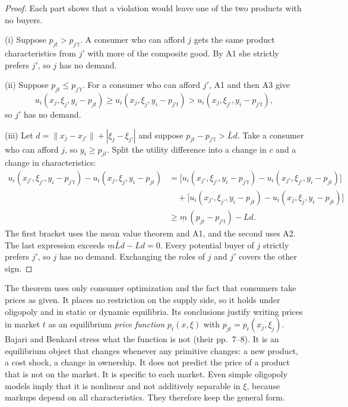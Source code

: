 \begin{proof}
Each part shows that a violation would leave one of the two products with no buyers.

(i) Suppose $p_{jt} > p_{j't}$. A consumer who can afford $j$ gets the same product characteristics from $j'$ with more of the
composite good. By A1 she strictly prefers $j'$, so $j$ has no demand.

(ii) Suppose $p_{jt} \le p_{j't}$. For a consumer who can afford $j'$, A1 and then A3 give
\begin{equation*}
  u_i(x_j, \xi_j, y_i - p_{jt}) \ge u_i(x_j, \xi_j, y_i - p_{j't}) > u_i(x_j, \xi_{j'}, y_i - p_{j't}) ,
\end{equation*}
so $j'$ has no demand.

(iii) Let $d = \lVert x_j - x_{j'} \rVert + |\xi_j - \xi_{j'}|$ and suppose $p_{jt} - p_{j't} > \bar L d$. Take a consumer who can
afford $j$, so $y_i \ge p_{jt}$. Split the utility difference into a change in $c$ and a change in characteristics:
\begin{align*}
  u_i(x_{j'}, \xi_{j'}, y_i - p_{j't}) - u_i(x_j, \xi_j, y_i - p_{jt})
  &= \bigl[u_i(x_{j'}, \xi_{j'}, y_i - p_{j't}) - u_i(x_{j'}, \xi_{j'}, y_i - p_{jt})\bigr] \\
  &\quad + \bigl[u_i(x_{j'}, \xi_{j'}, y_i - p_{jt}) - u_i(x_j, \xi_j, y_i - p_{jt})\bigr] \\
  &\ge \underline{m}\,(p_{jt} - p_{j't}) - L d .
\end{align*}
The first bracket uses the mean value theorem and A1, and the second uses A2. The last expression exceeds $\underline{m} \bar L d -
L d = 0$. Every potential buyer of $j$ strictly prefers $j'$, so $j$ has no demand. Exchanging the roles of $j$ and $j'$
covers the other sign.
\end{proof}

The theorem uses only consumer optimization and the fact that consumers take prices as given. It places no restriction on
the supply side, so it holds under oligopoly and in static or dynamic equilibria. Its conclusions justify writing prices in
market $t$ as an equilibrium \emph{price function} $p_t(x, \xi)$ with $p_{jt} = p_t(x_j, \xi_j)$. Bajari and Benkard stress
what the function is not (their pp.~7--8). It is an equilibrium object that changes whenever any primitive changes: a new
product, a cost shock, a change in ownership. It does not predict the price of a product that is not on the market. It is
specific to each market. Even simple oligopoly models imply that it is nonlinear and not additively separable in $\xi$,
because markups depend on all characteristics. They therefore keep the general form.

